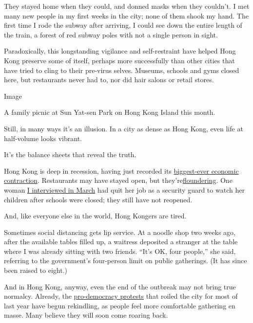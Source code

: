 They stayed home when they could, and donned masks when they couldn't. I
met many new people in my first weeks in the city; none of them shook my
hand. The first time I rode the subway after arriving, I could see down
the entire length of the train, a forest of red subway poles with not a
single person in sight.

Paradoxically, this longstanding vigilance and self-restraint have
helped Hong Kong preserve some of itself, perhaps more successfully than
other cities that have tried to cling to their pre-virus selves.
Museums, schools and gyms closed here, but restaurants never had to, nor
did hair salons or retail stores.

Image

A family picnic at Sun Yat-sen Park on Hong Kong Island this month.

Still, in many ways it's an illusion. In a city as dense as Hong Kong,
even life at half-volume looks vibrant.

It's the balance sheets that reveal the truth.

Hong Kong is deep in recession, having just recorded its
\href{https://www.scmp.com/news/hong-kong/hong-kong-economy/article/3082769/coronavirus-hong-kongs-economy-slumps-89-cent}{biggest-ever
economic contraction}. Restaurants may have stayed open, but
they're\href{https://www.scmp.com/news/hong-kong/health-environment/article/3083160/coronavirus-earnings-hong-kongs-food-and-beverage}{floundering}.
One woman
\href{https://www.nytimes3xbfgragh.onion/2020/03/04/world/coronavirus-schools-closed.html}{I
interviewed in March} had quit her job as a security guard to watch her
children after schools were closed; they still have not reopened.

And, like everyone else in the world, Hong Kongers are tired.

Sometimes social distancing gets lip service. At a noodle shop two weeks
ago, after the available tables filled up, a waitress deposited a
stranger at the table where I was already sitting with two friends.
``It's OK, four people,'' she said, referring to the government's
four-person limit on public gatherings. (It has since been raised to
eight.)

And in Hong Kong, anyway, even the end of the outbreak may not bring
true normalcy. Already, the
\href{https://www.nytimes3xbfgragh.onion/news-event/hong-kong-protests}{pro-democracy
protests} that roiled the city for most of last year have begun
rekindling, as people feel more comfortable gathering en masse. Many
believe they will soon come roaring back.


